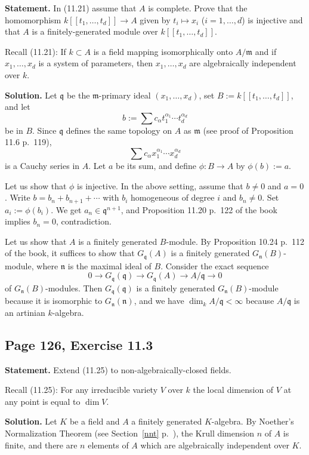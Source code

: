 \documentclass[parskip=half,fontsize=12pt]{scrartcl}%
\newcommand{\mf}{\mathfrak}
\newcommand{\mmm}{\mf m}
\newcommand{\nnn}{\mf n}
\newcommand{\qqq}{\mf q}
\begin{document}
\textbf{Statement.} In (11.21) assume that $A$ is complete. Prove that the homomorphism $k[[t_1,\ldots,t_d]]\to A$ given by $t_i\mapsto x_i$ ($i=1,\ldots,d$) is injective and that $A$ is a finitely-generated module over $k[[t_1,\ldots,t_d]]$.

Recall (11.21): If $k\subset A$ is a field mapping isomorphically onto $A/\mmm$ and if $x_1,\ldots,x_d$ is a system of parameters, then $x_1,\ldots,x_d$ are algebraically independent over $k$.

\textbf{Solution.} Let $\qqq$ be the $\mmm$-primary ideal $(x_1,\ldots,x_d)$, %
set $B:=k[[t_1,\ldots,t_d]]$, and let 
$$
b:=\sum c_\alpha t_1^{\alpha_1}\cdots t_d^{\alpha_d}
$$ 
be in $B$. Since $\qqq$ defines the same topology on $A$ as $\mmm$ (see proof of Proposition 11.6 p.~119), 
$$
\sum c_\alpha x_1^{\alpha_1}\cdots x_d^{\alpha_d}
$$ 
is a Cauchy series in $A$. Let $a$ be its sum, and define $\phi:B\to A$ by $\phi(b):=a$. 

Let us show that $\phi$ is injective. In the above setting, assume that $b\ne0$ and $a=0$. Write $b=b_n+b_{n+1}+\cdots$ with $b_i$ homogeneous of degree $i$ and $b_n\ne0$. Set $a_i:=\phi(b_i)$. We get $a_n\in\qqq^{n+1}$, and Proposition 11.20 p.~122 of the book implies $b_n=0$, contradiction. 

Let us show that $A$ is a finitely generated $B$-module. By Proposition 10.24 p.~112 of the book, it suffices to show that $G_\qqq(A)$ is a finitely generated $G_\nnn(B)$-module, where $\nnn$ is the maximal ideal of $B$. Consider the exact sequence 
$$
0\to G_\qqq(\qqq)\to G_\qqq(A)\to A/\qqq\to0
$$ 
of $G_\nnn(B)$-modules. Then $G_\qqq(\qqq)$ is a finitely generated $G_\nnn(B)$-module because it is isomorphic to $G_\nnn(\nnn)$, and we have $\dim_kA/\qqq<\infty$ because $A/\qqq$ is an artinian $k$-algebra. 

\subsection{Page 126, Exercise 11.3}%

\textbf{Statement.} Extend (11.25) to non-algebraically-closed fields.

Recall (11.25): For any irreducible variety $V$ over $k$ the local dimension of $V$ at any point is equal to $\dim V$.

\textbf{Solution.} Let $K$ be a field and $A$ a finitely generated $K$-algebra. By Noether's Normalization Theorem (see Section~\ref{nnt} p.~\pageref{nnt}), the Krull dimension $n$ of $A$ is finite, and there are $n$ elements of $A$ which are algebraically independent over $K$. 
\end{document}
